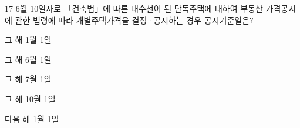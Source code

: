 \begin{question}{17}
6월 10일자로 「건축법」에 따른 대수선이 된 단독주택에 대하여 부동산 가격공시에 관한 법령에 따라 개별주택가격을 결정·공시하는 경우 공시기준일은?
\begin{choices}
  \item 그 해 1월 1일
  \item 그 해 6월 1일
  \item 그 해 7월 1일
  \item 그 해 10월 1일
  \item 다음 해 1월 1일
\end{choices}
\end{question}
